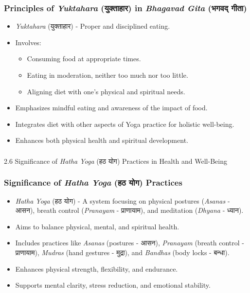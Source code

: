 \begin{frame}[fragile]\frametitle{Principles of \textit{Yuktahara} (युक्ताहार) in \textit{Bhagavad Gita} (भगवद् गीता)}

      \begin{itemize}
		\item \textit{Yuktahara} (युक्ताहार) - Proper and disciplined eating.
		\item Involves:
		  \begin{itemize}
		      \item Consuming food at appropriate times.
		      \item Eating in moderation, neither too much nor too little.
		      \item Aligning diet with one's physical and spiritual needs.
		  \end{itemize}
		\item Emphasizes mindful eating and awareness of the impact of food.
		\item Integrates diet with other aspects of Yoga practice for holistic well-being.
		\item Enhances both physical health and spiritual development.
	  \end{itemize}

\end{frame}



\begin{frame}[fragile]\frametitle{}
\begin{center}
{\Large 2.6  Significance of \textit{Hatha Yoga} (हठ योग) Practices in Health and Well-Being}
\end{center}
\end{frame}

\begin{frame}[fragile]\frametitle{Significance of \textit{Hatha Yoga} (हठ योग) Practices}

      \begin{itemize}
		\item \textit{Hatha Yoga} (हठ योग) - A system focusing on physical postures (\textit{Asanas} - आसन), breath control (\textit{Pranayam} - प्राणायाम), and meditation (\textit{Dhyana} - ध्यान).
		\item Aims to balance physical, mental, and spiritual health.
		\item Includes practices like \textit{Asanas} (postures - आसन), \textit{Pranayam} (breath control - प्राणायाम), \textit{Mudras} (hand gestures - मुद्रा), and \textit{Bandhas} (body locks - बन्धा).
		\item Enhances physical strength, flexibility, and endurance.
		\item Supports mental clarity, stress reduction, and emotional stability.
	  \end{itemize}

\end{frame}

